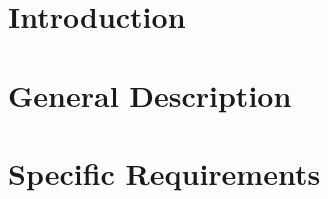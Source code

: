 \maketitle
\clearpage
\tableofcontents

\clearpage
\section{Introduction} \label{Intro}


\clearpage
\section{General Description} \label{Description}


\clearpage
\section{Specific Requirements} \label {Requirements}
